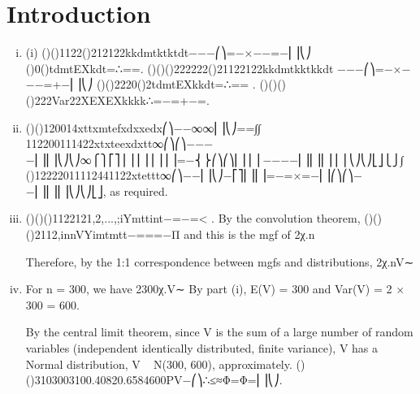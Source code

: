 \documentclass{article}
\author{kobriendublin }
\date{December 2018}
\begin{document}
\section{Introduction}
\begin{enumerate}[(i)]
\item


(i) ()()1122()212122kkdmtktktdt−−−⎛⎞=−×−−=−⎜⎟⎝⎠
()0()tdmtEXkdt=∴==.
()()()222222()21122122kkdmtkktkkdt −−−⎛⎞=−×−−−=+−⎜⎟⎝⎠
()()2220()2tdmtEXkkdt=∴== .
()()()()222Var22XEXEXkkkk∴=−=+−=.

\item ()()120014xttxmtefxdxxedx⎛⎞−−∞∞⎜⎟⎝⎠==∫∫
112200111422xtxteexdxtt∞⎛⎞⎛⎞−−−−⎜⎟⎜⎟⎝⎠⎝⎠∞⎧⎫⎡⎤⎪⎪⎢⎥⎪⎪⎢⎥=−⎨⎬⎛⎞⎛⎞⎢⎥⎪⎪−−−−⎜⎟⎜⎟⎢⎥⎪⎪⎝⎠⎝⎠⎣⎦⎩⎭∫
()12222011112441122xtettt∞⎛⎞−−⎜⎟⎝⎠−⎡⎤⎢⎥⎢⎥=−=×=−⎢⎥⎛⎞⎛⎞−−⎢⎥⎜⎟⎜⎟⎝⎠⎝⎠⎣⎦, as required.

\item ()()()1122121,2,...,;iYmttint−=−=< .
By the convolution theorem,
()()()2112,innVYimtmtt−===−Π and this is the mgf of 2χ.n

Therefore, by the 1:1 correspondence between mgfs and distributions, 2χ.nV∼

\item For n = 300, we have 2300χ.V∼
By part (i), E(V) = 300 and Var(V) = 2 × 300 = 600.

By the central limit theorem, since V is the sum of a large number of random variables (independent identically distributed, finite variance), V has a Normal distribution, V ~ N(300, 600), approximately.
()()3103003100.40820.6584600PV−⎛⎞∴≤≈Φ=Φ=⎜⎟⎝⎠.
\end{enumerate}
\end{document}
